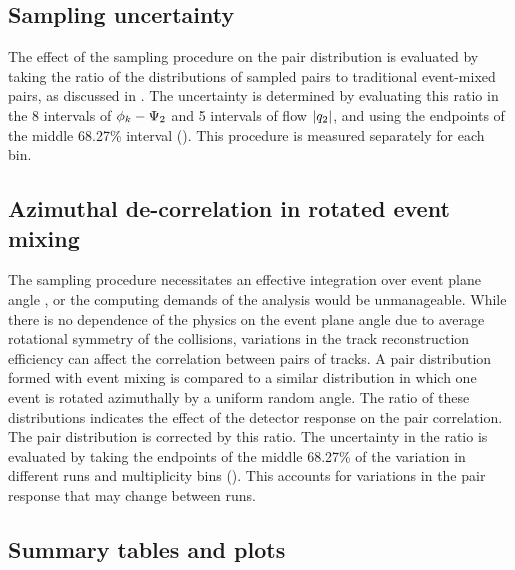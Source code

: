 \subsection{Sampling uncertainty}
The effect of the sampling procedure on the pair distribution is evaluated by taking the ratio of the distributions of sampled pairs to traditional event-mixed pairs, as discussed in .
The uncertainty is determined by evaluating this ratio in the 8 intervals of $\phi_{k} - \Psi_{2}$ and 5 intervals of flow $|q_{2}|$, and using the endpoints of the middle 68.27\% interval ().
This procedure is measured separately for each \kt bin.

\subsection{Azimuthal de-correlation in rotated event mixing}
The sampling procedure necessitates an effective integration over event plane angle \psit, or the computing demands of the analysis would be unmanageable. While there is no dependence of the physics on the event plane angle due to average rotational symmetry of the collisions, variations in the track reconstruction efficiency can affect the correlation between pairs of tracks. A pair distribution formed with event mixing is compared to a similar distribution in which one event is rotated azimuthally by a uniform random angle. The ratio of these distributions indicates the effect of the detector response on the pair correlation. The pair distribution is corrected by this ratio. The uncertainty in the ratio is evaluated by taking the endpoints of the middle 68.27\% of the variation in different runs and multiplicity bins (). This accounts for variations in the pair response that may change between runs.

\FloatBarrier
\subsection{Summary tables and plots}

\begin{center}




\end{center}

